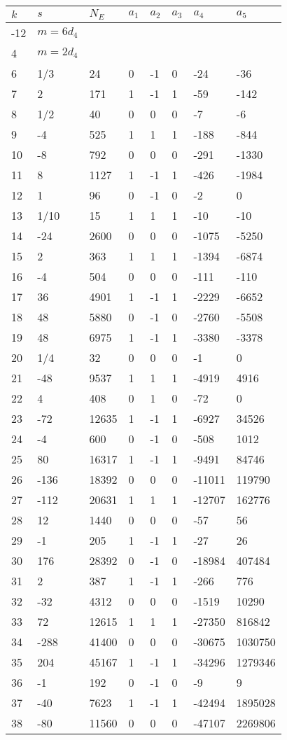 \documentclass{amsart}
\begin{document}
\begin{longtable}{|l|l|l|lllll|}
\hline
$k$ & $s$ & $N_E$ & $a_1$ & $a_2$ & $a_3$ & $a_4$ & $a_5$\\
\hline
-12&$m=6d_{4}$&&\multicolumn{5}{c|}{}\\
4&$m=2d_{4}$&&\multicolumn{5}{c|}{}\\
6&1/3&24&0&-1&0&-24&-36\\
7&2&171&1&-1&1&-59&-142\\
8&1/2&40&0&0&0&-7&-6\\
9&-4&525&1&1&1&-188&-844\\
10&-8&792&0&0&0&-291&-1330\\
11&8&1127&1&-1&1&-426&-1984\\
12&1&96&0&-1&0&-2&0\\
13&1/10&15&1&1&1&-10&-10\\
14&-24&2600&0&0&0&-1075&-5250\\
15&2&363&1&1&1&-1394&-6874\\
16&-4&504&0&0&0&-111&-110\\
17&36&4901&1&-1&1&-2229&-6652\\
18&48&5880&0&-1&0&-2760&-5508\\
19&48&6975&1&-1&1&-3380&-3378\\
20&1/4&32&0&0&0&-1&0\\
21&-48&9537&1&1&1&-4919&4916\\
22&4&408&0&1&0&-72&0\\
23&-72&12635&1&-1&1&-6927&34526\\
24&-4&600&0&-1&0&-508&1012\\
25&80&16317&1&-1&1&-9491&84746\\
26&-136&18392&0&0&0&-11011&119790\\
27&-112&20631&1&1&1&-12707&162776\\
28&12&1440&0&0&0&-57&56\\
29&-1&205&1&-1&1&-27&26\\
30&176&28392&0&-1&0&-18984&407484\\
31&2&387&1&-1&1&-266&776\\
32&-32&4312&0&0&0&-1519&10290\\
33&72&12615&1&1&1&-27350&816842\\
34&-288&41400&0&0&0&-30675&1030750\\
35&204&45167&1&-1&1&-34296&1279346\\
36&-1&192&0&-1&0&-9&9\\
37&-40&7623&1&-1&1&-42494&1895028\\
38&-80&11560&0&0&0&-47107&2269806\\

\end{longtable}
\end{document}
